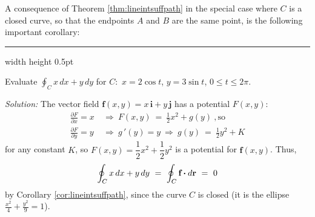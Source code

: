A consequence of Theorem \ref{thm:lineintsuffpath} in the special case where $C$ is a closed curve, so that the
endpoints $A$ and $B$ are the same point, is the following important corollary:


\medskip
\hrule width \textwidth height 0.5pt
\begin{exmp}
 Evaluate $\displaystyle\oint_C x\,dx + y\,dy$ for $C:$ $x=2\cos t$, $y=3\sin t$,
 $0\le t\le 2\pi$.\smallskip
 \par\noindent \emph{Solution:} The vector field $\mathbf{f}(x,y) = x\,\mathbf{i} + y\,\mathbf{j}$ has a
 potential $F(x,y)$:
 \begin{align*}
  \frac{\partial F}{\partial x} = x ~&\Rightarrow~ F(x,y) ~=~ \frac{1}{2}x^2 + g(y) ~,\text{so}\\
  \frac{\partial F}{\partial y} = y ~&\Rightarrow~ g\,'(y) = y ~\Rightarrow~ g(y) ~=~ \frac{1}{2}y^2 + K
 \end{align*}
 for any constant $K$, so $F(x,y) = \dfrac{1}{2}x^2 + \dfrac{1}{2}y^2$ is a potential for $\mathbf{f}(x,y)$. Thus,
 \begin{displaymath}
  \displaystyle\oint_C x\,dx + y\,dy ~=~ \displaystyle\oint_{C} \textbf{f} \bm{\cdot} d\textbf{r} ~=~ 0
 \end{displaymath}
 by Corollary \ref{cor:lineintsuffpath}, since the curve $C$ is closed (it is the ellipse
 $\frac{x^2}{4}+\frac{y^2}{9}=1$).
\end{exmp}
\startexercises\label{sec4dot2}

